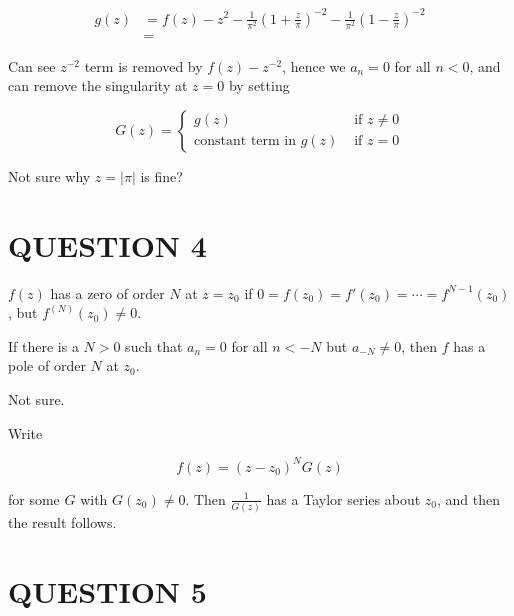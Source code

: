 \documentclass[a4paper]{article}
\begin{document}
\begin{align*}
g(z) & = f(z) - z^{2} - \frac{1}{\pi^{2}}  \left(  1 + \frac{z}{\pi} \right)^{-2} -  \frac{1}{\pi^{2}} \left(  1 - \frac{z}{\pi} \right)^{-2}  \\
& = 
\end{align*}

Can see $ z^{-2} $ term is removed by $ f(z) - z^{-2} $, hence we $ a_{n} = 0 $ for all $ n < 0 $, and can remove the singularity at $ z = 0 $ by setting 


\[ G(z) =  \begin{cases} g(z)  & \text{ if } z \neq 0 \\ \text{constant term in } g(z) & \text{ if } z = 0 \end{cases}  \]

Not sure why $ z = | \pi |  $ is fine?



\section{QUESTION 4}


$ f(z) $ has a zero of order $ N $ at $ z = z_{0} $ if $ 0 = f(z_{0}) = f'(z_{0}) = \cdots = f^{N-1}(z_{0}) $, but $ f^{(N)}(z_{0}) \neq 0 $. 

If there is a $ N > 0 $ such that $ a_n = 0 $ for all $ n < -N $ but $ a_{-N} \neq 0$,  then $ f $ has a pole of order $ N $ at $ z_{0} $.

Not sure.


Write 

\[ f(z) = (z - z_{0})^{N} G(z) \]

for some $ G $ with $ G(z_{0}) \neq 0 $. Then $ \frac{1}{G(z)} $ has a Taylor series about $ z_{0} $, and then the result follows. 


\section{QUESTION 5}
\end{document}
